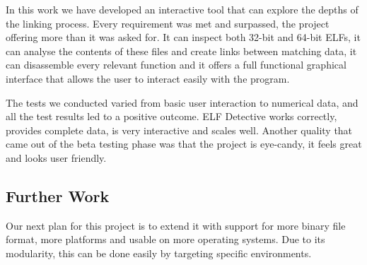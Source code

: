 In this work we have developed an interactive tool that can explore the depths of the linking process. Every requirement was met and surpassed, the project offering more than it was asked for. It can inspect both 32-{}bit and 64-{}bit ELFs, it can analyse the contents of these files and create links between matching data, it can disassemble every relevant function and it offers a full functional graphical interface that allows the user to interact easily with the program.

The tests we conducted varied from basic user interaction to numerical data, and all the test results led to a positive outcome. ELF Detective works correctly, provides complete data, is very interactive and scales well. Another quality that came out of the beta testing phase was that the project is eye-{}candy, it feels great and looks user friendly. 

\subsection{Further Work}
\label{sec:furth-work}

Our next plan for this project is to extend it with support for more binary file format, more platforms and usable on more operating systems. Due to its modularity, this can be done easily by targeting specific environments.